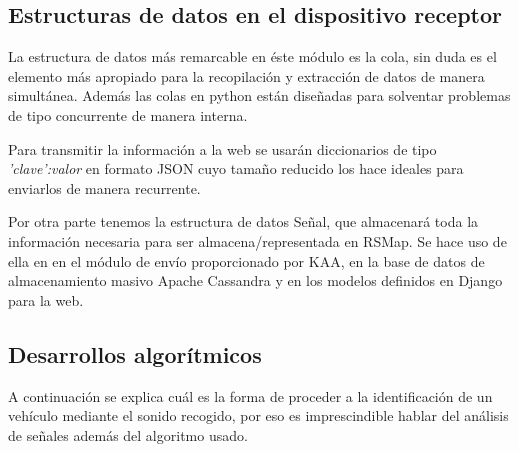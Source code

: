 \subsection{Estructuras de datos en el dispositivo receptor}
La estructura de datos más remarcable en éste módulo es la cola, sin duda es el elemento más apropiado para la recopilación y extracción de datos de manera simultánea. Además las colas en python están diseñadas para solventar problemas de tipo concurrente de manera interna.

\bigskip

Para transmitir la información a la web se usarán diccionarios de tipo \textit{'clave':valor} en formato JSON cuyo tamaño reducido los hace ideales para enviarlos de manera recurrente.

\bigskip

Por otra parte tenemos la estructura de datos Señal, que almacenará toda la información necesaria para ser almacena/representada en RSMap. Se hace uso de ella en en el módulo de envío proporcionado por KAA, en la base de datos de almacenamiento masivo Apache Cassandra y en los modelos definidos en Django para la web.

\subsection{Desarrollos algorítmicos}

A continuación se explica cuál es la forma de proceder a la identificación de un vehículo mediante el sonido recogido, por eso es imprescindible hablar del análisis de señales además del algoritmo usado.

